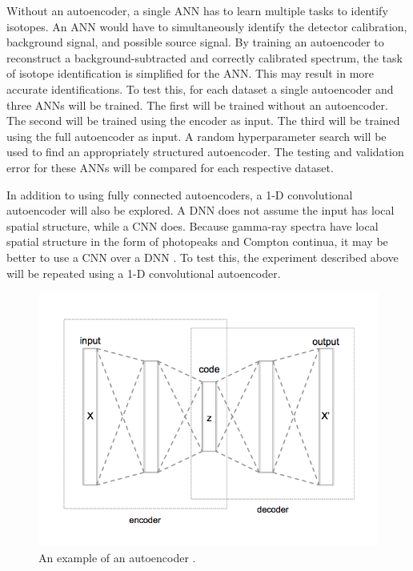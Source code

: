 Without an autoencoder, a single ANN has to learn multiple tasks to identify isotopes. An ANN would have to simultaneously identify the detector calibration, background signal, and possible source signal. By training an autoencoder to reconstruct a background-subtracted and correctly calibrated spectrum, the task of isotope identification is simplified for the ANN. This may result in more accurate identifications. To test this, for each dataset a single autoencoder and three ANNs will be trained. The first will be trained without an autoencoder. The second will be trained using the encoder as input. The third will be trained using the full autoencoder as input. A random hyperparameter search will be used to find an appropriately structured autoencoder. The testing and validation error for these ANNs will be compared for each respective dataset.

In addition to using fully connected autoencoders, a 1-D convolutional autoencoder will also be explored. A DNN does not assume the input has local spatial structure, while a CNN does. Because gamma-ray spectra have local spatial structure in the form of photopeaks and Compton continua, it may be better to use a CNN over a DNN \cite{CHARTE2018}. To test this, the experiment described above will be repeated using a 1-D convolutional autoencoder.


\begin{figure}[H]
\centering
\includegraphics[width=0.8\linewidth]{images/Autoencoder_structure}
\caption{An example of an autoencoder \cite{wiki:AutoencoderStructure}.}
\label{fig:Autoencoder_structure}
\end{figure}


